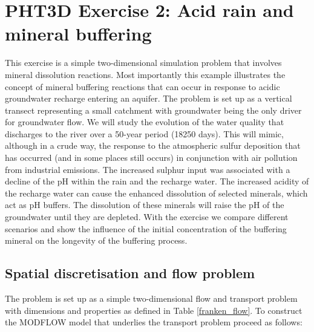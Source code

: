 \section[PHT3D Exercise 2: Mineral buffering Acid rain and mineral bufferin]{PHT3D Exercise 2: Acid rain and mineral buffering}


This exercise is a simple two-dimensional simulation problem that involves mineral dissolution reactions. 
Most importantly this example illustrates the concept of mineral buffering reactions that can occur 
in response to acidic groundwater recharge entering an aquifer. 
The problem is set up as a vertical transect representing a small catchment with groundwater being the only driver for groundwater flow. We will study the evolution of the water quality that discharges to the river over a 50-year period (18250 days). This will mimic, although in a crude way, the response to the atmospheric sulfur deposition that has occurred (and in some places still occurs) in conjunction with air pollution from industrial emissions.
The increased sulphur input was associated with a decline of the pH within the rain and the recharge water.
The increased acidity of the recharge water can cause the enhanced dissolution of selected minerals, which act as pH buffers. The dissolution of these minerals will raise the pH of the groundwater until they are depleted. 
With the exercise we compare different scenarios and show the influence of the initial concentration of the buffering mineral on the longevity of the buffering process.

\subsection[Spatial discretisation and flow problem]{Spatial discretisation and flow problem}

The problem is set up as a simple two-dimensional flow and transport problem with dimensions and properties as defined in Table \ref{franken_flow}. To construct the MODFLOW model that underlies the transport problem proceed as follows:




